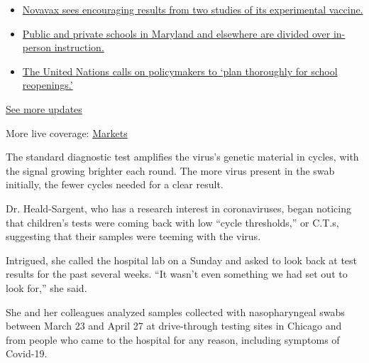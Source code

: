 \begin{itemize}
\tightlist
\item
  \href{https://www.nytimes.com/2020/08/04/world/coronavirus-cases.html?action=click\&pgtype=Article\&state=default\&region=MAIN_CONTENT_1\&context=storylines_live_updates\#link-1228a480}{Novavax
  sees encouraging results from two studies of its experimental
  vaccine.}
\item
  \href{https://www.nytimes.com/2020/08/04/world/coronavirus-cases.html?action=click\&pgtype=Article\&state=default\&region=MAIN_CONTENT_1\&context=storylines_live_updates\#link-4825b93}{Public
  and private schools in Maryland and elsewhere are divided over
  in-person instruction.}
\item
  \href{https://www.nytimes.com/2020/08/04/world/coronavirus-cases.html?action=click\&pgtype=Article\&state=default\&region=MAIN_CONTENT_1\&context=storylines_live_updates\#link-50f7386d}{The
  United Nations calls on policymakers to `plan thoroughly for school
  reopenings.'}
\end{itemize}

\href{https://www.nytimes.com/2020/08/04/world/coronavirus-cases.html?action=click\&pgtype=Article\&state=default\&region=MAIN_CONTENT_1\&context=storylines_live_updates}{See
more updates}

More live coverage:
\href{https://www.nytimes.com/live/2020/08/04/business/stock-market-today-coronavirus?action=click\&pgtype=Article\&state=default\&region=MAIN_CONTENT_1\&context=storylines_live_updates}{Markets}

The standard diagnostic test amplifies the virus's genetic material in
cycles, with the signal growing brighter each round. The more virus
present in the swab initially, the fewer cycles needed for a clear
result.

Dr. Heald-Sargent, who has a research interest in coronaviruses, began
noticing that children's tests were coming back with low ``cycle
thresholds,'' or C.T.s, suggesting that their samples were teeming with
the virus.

Intrigued, she called the hospital lab on a Sunday and asked to look
back at test results for the past several weeks. ``It wasn't even
something we had set out to look for,'' she said.

She and her colleagues analyzed samples collected with nasopharyngeal
swabs between March 23 and April 27 at drive-through testing sites in
Chicago and from people who came to the hospital for any reason,
including symptoms of Covid-19.

